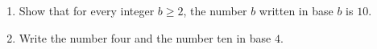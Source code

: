 \begin{enumerate}
\item[(a)] Show that for every integer $b\ge2$, the number $b$ written in base $b$ is $10$.
\item[(b)] Write the number four and the number ten in base $4$.
\end{enumerate}
